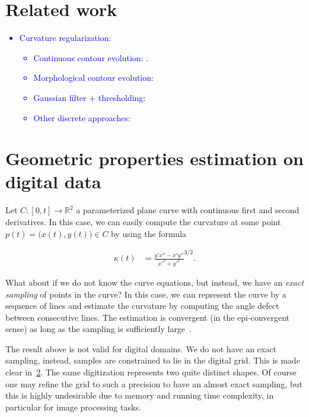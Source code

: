 \documentclass[smallextended]{svjour3}
\newcommand{\todo}[1]{{\textcolor{blue}{#1}}}
\begin{document}
\section{Related work}
\todo{
\begin{itemize}
\item{Curvature regularization:
\begin{itemize}
\item{Continuous contour evolution: \cite{kass1988snakes}
\cite{chan01}.}
\item{Morphological contour evolution: \cite{marquezneila14} }
\item{Gaussian filter + thresholding: \cite{merriman1992diffusion} }
\item{Other discrete approaches: \cite{schoenemann09linear} 
\cite{zehiry10fast}
\cite{nieuwenhuis14efficient} \cite{antunes19} \cite{antunes20}}
\end{itemize}}
\end{itemize}}

\section{Geometric properties estimation on digital data}

Let $C:[0,t] \rightarrow \mathbb{R}^2$ a parameterized plane curve with continuous first and second derivatives. In this case, we can easily compute the curvature at some point $p(t) = \big( x(t),y(t) \big) \in C$ by using the formula

\begin{align*}
\kappa (t) &= \frac{y'x'' -x'y''}{x'^2 + y'^2}^{3/2}.
\end{align*}

What about if we do not know the curve equations, but instead, we have an \emph{exact sampling} of points in the curve? In this case, we can represent the curve by a sequence of lines and estimate the curvature by computing the angle defect between consecutive lines. The estimation is convergent (in the epi-convergent sense) as long as the sampling is sufficiently large~\cite{bruckstein01discrete,bruckstein01convergence}.

The result above is not valid for digital domains. We do not have an exact sampling, instead, samples are constrained to lie in the digital grid. This is made clear in~\ref{}. The same digitization represents two quite distinct shapes. Of course one may refine the grid to such a precision to have an almost exact sampling, but this is highly undesirable due to memory and running time complexity, in particular for image processing tasks. 
\end{document}
